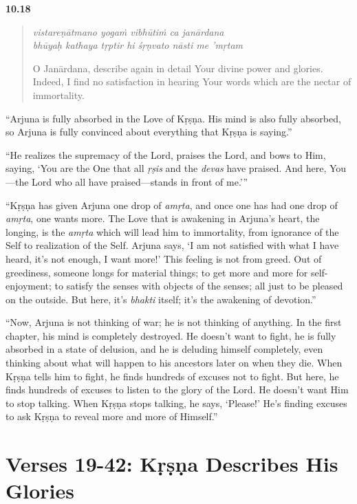\par\noindent\textbf{10.18}\par
\begin{verse}
\textit{vistareṇātmano yogaṁ vibhūtiṁ ca janārdana} \\
\textit{bhūyaḥ kathaya tṛptir hi śṛṇvato nāsti me ’mṛtam}

\noindent O Janārdana, describe again in detail Your divine power and glories. Indeed, I find no satisfaction in hearing Your words which are the nectar of immortality.
\end{verse}
\par




\enquote{Arjuna is fully absorbed in the Love of Kṛṣṇa. His mind is also fully absorbed, so Arjuna is fully convinced about everything that Kṛṣṇa is saying.}

\enquote{He realizes the supremacy of the Lord, praises the Lord, and bows to Him, saying, \enquote{You are the One that all \textit{ṛṣis} and the \textit{devas} have praised. And here, You---the Lord who all have praised---stands in front of me.}}

\enquote{Kṛṣṇa has given Arjuna one drop of \textit{amṛta}, and once one has had one drop of \textit{amṛta}, one wants more. The Love that is awakening in Arjuna’s heart, the longing, is the \textit{amṛta} which will lead him to immortality, from ignorance of the Self to realization of the Self. Arjuna says, \enquote{I am not satisfied with what I have heard, it’s not enough, I want more!} This feeling is not from greed. Out of greediness, someone longs for material things; to get more and more for self-enjoyment; to satisfy the senses with objects of the senses; all just to be pleased on the outside. But here, it’s \textit{bhakti} itself; it’s the awakening of devotion.}

\enquote{Now, Arjuna is not thinking of war; he is not thinking of anything. In the first chapter, his mind is completely destroyed. He doesn’t want to fight, he is fully absorbed in a state of delusion, and he is deluding himself completely, even thinking about what will happen to his ancestors later on when they die. When Kṛṣṇa tells him to fight, he finds hundreds of excuses not to fight. But here, he finds hundreds of excuses to listen to the glory of the Lord. He doesn’t want Him to stop talking. When Kṛṣṇa stops talking, he says, \enquote{Please!} He’s finding excuses to ask Kṛṣṇa to reveal more and more of Himself.}

\section{Verses 19-42: Kṛṣṇa Describes His Glories}\label{sec-verses-19-42-krsna-describes-his-glories}


